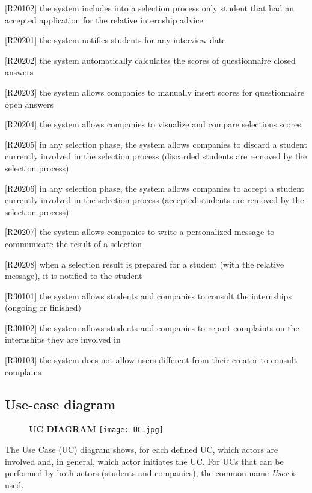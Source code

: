 		[R20102] the system includes into a selection process only student that had an accepted application for the relative internship advice
		
		[R20201] the system notifies students for any interview date
		
		[R20202] the system automatically calculates the scores of questionnaire closed answers
		
		[R20203] the system allows companies to manually insert scores for questionnaire open answers
		
		[R20204] the system allows companies to visualize and compare selections scores
		
		[R20205] in any selection phase, the system allows companies to discard a student currently involved in the selection process (discarded students are removed by the selection process)
		
		[R20206] in any selection phase, the system allows companies to accept a student currently involved in the selection process (accepted students are removed by the selection process)
		
		[R20207] the system allows companies to write a personalized message to communicate the result of a selection
		
		[R20208] when a selection result is prepared for a student (with the relative message), it is notified to the student
		
		[R30101] the system allows students and companies to consult the internships (ongoing or finished)
		
		[R30102] the system allows students and companies to report complaints on the internships they are involved in
		
		[R30103] the system does not allow users different from their creator to consult complains
		
		\subsection{Use-case diagram}
			
			\begin{figure}[H]
				\centering
				{\bfseries UC DIAGRAM}
				\texttt{[image: UC.jpg]}
				
			\end{figure}
			
			The Use Case (UC) diagram shows, for each defined UC, which actors are involved and, in general, which actor initiates the UC. For UCs that can be performed by both actors (students and companies), the common name \textit{User} is used.
			
